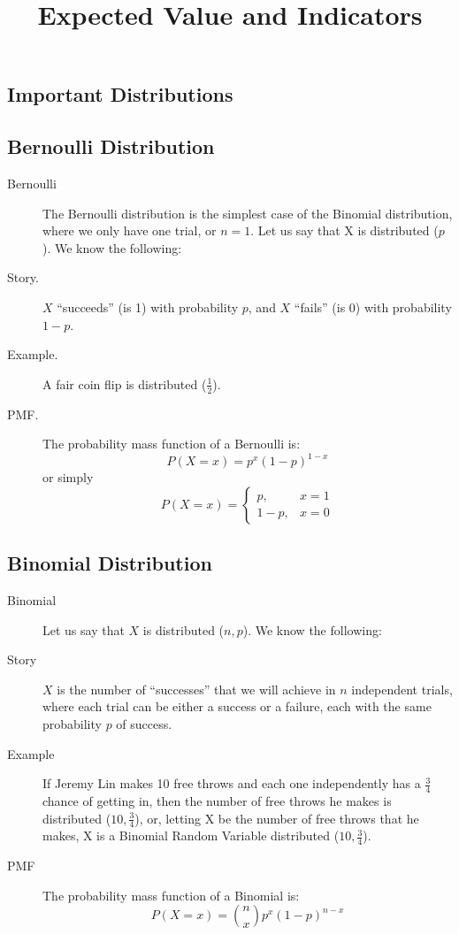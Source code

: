 \documentclass[11pt]{article}
\title{Expected Value and Indicators}
\author{\justin}
\begin{document}
\maketitle

\begin{notes}

\section*{Important Distributions}

\subsection*{Bernoulli Distribution}
\begin{description}
    \item[Bernoulli] The Bernoulli distribution is the simplest case of the Binomial distribution, where we only have one trial, or $n=1$. Let us say that X is distributed \Bern($p$). We know the following:
	\item[Story.] $X$ ``succeeds'' (is 1) with probability $p$, and $X$ ``fails'' (is 0) with probability $1-p$.
	\item[Example.] A fair coin flip is distributed \Bern($\frac{1}{2}$).
	\item[PMF.] The probability mass function of a Bernoulli is:
\[P(X = x) = p^x(1-p)^{1-x}\]
or simply
\[P(X = x) = \begin{cases} p, & x = 1 \\ 1-p, & x = 0 \end{cases}\]
\end{description}

\subsection*{Binomial Distribution}
\begin{description}
    \item[Binomial] Let us say that $X$ is distributed \Bin($n,p$). We know the following:
	\item[Story] $X$ is the number of ``successes'' that we will achieve in $n$ independent trials, where each trial can be either a success or a failure, each with the same probability $p$ of success.
	\item[Example] If Jeremy Lin makes 10 free throws and each one independently has a $\frac{3}{4}$ chance of getting in, then the number of free throws he makes is distributed  \Bin($10,\frac{3}{4}$), or, letting X be the number of free throws that he makes, X is a Binomial Random Variable distributed  \Bin($10,\frac{3}{4}$).
	\item[PMF] The probability mass function of a Binomial is:
\[P(X = x) = {n  \choose x} p^x(1-p)^{n-x}\]
\end{description}


\end{notes}
\end{document}
